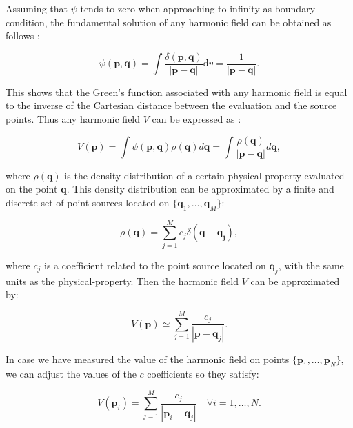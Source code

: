 \documentclass[twocolumn]{article}
\begin{document}
Assuming that $\psi$ tends to zero when approaching to infinity as boundary
condition, the fundamental solution of any harmonic field can be obtained as
follows \citep{blakely1995}:

\begin{equation}
    \psi(\mathbf{p}, \mathbf{q})
    =
    \int
    \frac{\delta(\mathbf{p}, \mathbf{q})}{|\mathbf{p} - \mathbf{q}|}
    \textrm{d}v
    =
    \frac{1}{|\mathbf{p} - \mathbf{q}|}.
\end{equation}

This shows that the Green's function associated with any harmonic field is
equal to the inverse of the Cartesian distance between the evaluation and the
source points.
Thus any harmonic field $V$ can be expressed as \citep[p.~37]{blakely1995}:

\begin{equation}
    V(\mathbf{p})
    =
    \int \psi(\mathbf{p}, \mathbf{q}) \rho(\mathbf{q}) d\mathbf{q}
    =
    \int \frac{\rho(\mathbf{q})}{|\mathbf{p} - \mathbf{q}|}  d\mathbf{q},
\end{equation}

\noindent where $\rho(\mathbf{q})$ is the density distribution of a certain
physical-property evaluated on the point $\mathbf{q}$. This density
distribution can be approximated by a finite and discrete set of point sources
located on $\{\mathbf{q}_1, \ldots, \mathbf{q}_M\}$:

\begin{equation}
    \rho(\mathbf{q}) =
        \sum\limits_{j=1}^{M} c_j \delta(\mathbf{q} - \mathbf{q_j}),
\end{equation}

\noindent where $c_j$ is a coefficient related to the point source located on
$\mathbf{q}_j$, with the same units as the physical-property.
Then the harmonic field $V$ can be approximated by:

\begin{equation}
    V(\mathbf{p})
    \simeq
    \sum\limits_{j=1}^{M} \frac{c_j}{|\mathbf{p} - \mathbf{q}_j|}.
\end{equation}

In case we have measured the value of the harmonic field on points
$\{\mathbf{p}_1, \ldots, \mathbf{p}_N\}$, we can adjust the values of the $c$
coefficients so they satisfy:

\begin{equation}
    V(\mathbf{p}_i)
    =
    \sum\limits_{j=1}^{M} \frac{c_j}{|\mathbf{p}_i - \mathbf{q}_j|}
    \quad \forall i=1,\ldots,N.
\end{equation}
\end{document}
